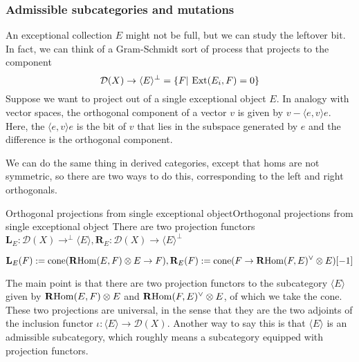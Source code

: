 

\subsubsection{Admissible subcategories and mutations}
An exceptional collection $E$ might not be full, but we can study the leftover bit. In fact, we can think of a Gram-Schmidt sort of process that projects to the component $$\mathcal{D}(X)\rightarrow \langle E\rangle^\perp=\{F|\, \operatorname{Ext}(E_i, F)=0\}$$
Suppose we want to project out of a single exceptional object $E$. In analogy with vector spaces, the orthogonal component of a vector $v$ is given by $v-\langle e,v \rangle e$. Here, the $\langle e,v \rangle e$ is the bit of $v$ that lies in the subspace generated by $e$ and the difference is the orthogonal component. 

We can do the same thing in derived categories, except that homs are not symmetric, so there are two ways to do this, corresponding to the left and right orthogonals.

\begin{definition}{Orthogonal projections from single exceptional object}{Orthogonal projections from single exceptional object}
    There are two projection functors $\mathbf{L}_E:\mathcal{D}(X)\rightarrow ^\perp\langle E\rangle , \mathbf{R}_E:\mathcal{D}(X)\rightarrow \langle E\rangle^\perp $

$$\mathbf{L}_E(F):=\mathrm{cone}(\operatorname{\mathbf{R}Hom}(E,F)\otimes E \rightarrow F), \mathbf{R}_E(F):=\mathrm{cone}(F\rightarrow \operatorname{\mathbf{R}Hom}(F,E)^\lor\otimes E )[-1]$$
\end{definition}

The main point is that there are two projection functors to the subcategory $\langle E \rangle$ given by $\operatorname{\mathbf{R}Hom}(E,F)\otimes E$ and $\operatorname{\mathbf{R}Hom}(F,E)^\lor\otimes E$, of which we take the cone. These two projections are universal, in the sense that they are the two adjoints of the inclusion functor $\iota:\langle E \rangle \rightarrow \mathcal{D}(X)$. Another way to say this is that $\langle E \rangle$ is an admissible subcategory, which roughly means a subcategory equipped with projection functors.

